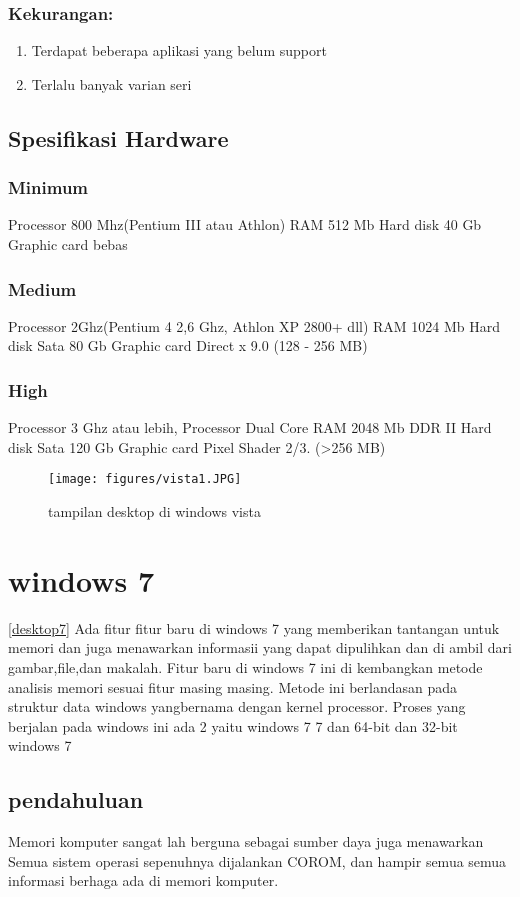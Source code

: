 		\subsubsection{Kekurangan:}
\begin{enumerate}
			\item Terdapat beberapa aplikasi yang belum support
			\item Terlalu banyak varian seri
\end{enumerate}
	\subsection{Spesifikasi Hardware}
		\subsubsection{Minimum}
			Processor 800 Mhz(Pentium III atau Athlon)
			RAM 512 Mb
			Hard disk 40 Gb
			Graphic card bebas
		\subsubsection{Medium}
			Processor 2Ghz(Pentium 4 2,6 Ghz, Athlon XP 2800+ dll)
			RAM 1024 Mb
			Hard disk Sata 80 Gb
			Graphic card Direct x 9.0 (128 - 256 MB)
		\subsubsection{High}
			Processor 3 Ghz atau lebih, Processor Dual Core
			RAM 2048 Mb DDR II
			Hard disk Sata 120 Gb
			Graphic card Pixel Shader 2/3. (>256 MB)


\begin{figure}[ht]
\centerline{\texttt{[image: figures/vista1.JPG]}}
\caption{tampilan desktop di windows vista}
\label{vista1}
\end{figure}


	\section{windows 7}
\ref{desktop7}
		Ada fitur fitur baru di windows 7 yang memberikan tantangan untuk memori
		dan juga menawarkan informasii yang dapat dipulihkan dan di ambil dari
		gambar,file,dan makalah. Fitur baru di windows 7 ini di kembangkan 
		metode analisis memori sesuai fitur masing masing. Metode ini
		berlandasan pada struktur data windows yangbernama dengan kernel
		processor. Proses yang berjalan pada windows ini ada 2 yaitu windows 7 
		7 dan 64-bit dan 32-bit windows 7
		\subsection{pendahuluan}
			Memori komputer sangat lah berguna sebagai sumber daya juga menawarkan
			Semua sistem operasi sepenuhnya dijalankan COROM, dan hampir semua
			semua informasi berhaga ada di memori komputer.
